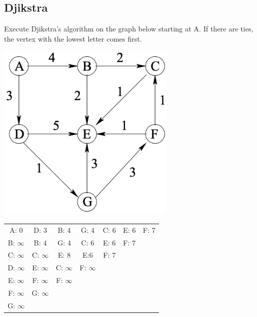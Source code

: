 \documentclass{article}
\begin{document}
\begin{multicols*}{2}
    \subsection*{Djikstra}
    Execute Djikstra's algorithm on the graph below starting at A. If there are
    ties, the vertex with the lowest letter comes first.
    \vspace{-3em}
    \begin{multicols*}{2}
        \includegraphics[width=\columnwidth]{djikstra.png}
        \begin{tabular}{ccccccc}
            A: 0          & D: 3          & B: 4          & G: 4          & C: 6 &
            E: 6          & F: 7                                                   \\
            B: \(\infty\) & B: 4          & G: 4          & C: 6          & E: 6 &
            F: 7                                                                   \\
            C: \(\infty\) & C: \(\infty\) & E: 8          & E:6           & F: 7
            \\
            D: \(\infty\) & E: \(\infty\) & C: \(\infty\) & F: \(\infty\)
            \\
            E: \(\infty\) & F: \(\infty\) & F: \(\infty\)
            \\
            F: \(\infty\) & G: \(\infty\)
            \\
            G: \(\infty\)
        \end{tabular}


\end{multicols*}
\end{multicols*}
\end{document}
